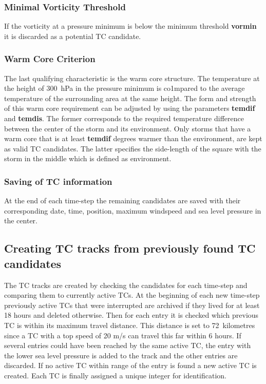 \subsubsection*{Minimal Vorticity Threshold}
If the vorticity at a pressure minimum is below the minimum threshold
\textbf{vormin} it is discarded as a potential TC candidate.

\subsubsection*{Warm Core Criterion}
The last qualifying characteristic is the warm core structure. The temperature
at the height of 300~hPa in the pressure minimum is co1mpared to the average
temperature of the surrounding area at the same height. The form and strength
of this warm core requirement can be adjusted by using the parameters
\textbf{temdif} and \textbf{temdis}. The former corresponds to the required
temperature difference between the center of the storm and its environment.
Only storms that have a warm core that is at least \textbf{temdif} degrees
warmer than the environment, are kept as valid TC candidates. The latter
specifies the side-length of the square with the storm in the middle which is
defined as environment.
\subsubsection*{Saving of TC information}
At the end of each time-step the remaining candidates are saved with their
corresponding date, time, position, maximum windspeed and sea level pressure in
the center.

\subsection{Creating TC tracks from previously found TC candidates}
The TC tracks are created by checking the candidates for each time-step and
comparing them to currently active TCs. At the beginning of each new time-step
previously active TCs that were interrupted are archived if they lived for at
least 18 hours and deleted otherwise. Then for each entry it is checked which
previous TC is within its maximum travel distance. This distance is set to
72~kilometres since a TC with a top speed of 20 m/s can travel this far within
6 hours. If several entries could have been reached by the same active TC, the
entry with the lower sea level pressure is added to the track and the other
entries are discarded. If no active TC within range of the entry is found a new
active TC is created. Each TC is finally assigned a unique integer for
identification.

